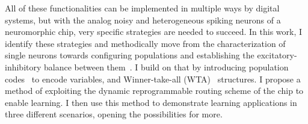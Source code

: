 All of these functionalities can be implemented in multiple ways by digital systems, but with the analog noisy and heterogeneous spiking neurons of a neuromorphic chip, very specific strategies are needed to succeed. In this work, I identify these strategies and methodically move from the characterization of single neurons towards configuring populations and establishing the excitatory-inhibitory balance between them~\cite{Vreeswijk_Sompolinsky96,Shew_etal11,Lim_Goldman13}. I build on that by introducing population codes~\cite{Averbeck_etal06} to encode variables, and Winner-take-all (WTA)~\cite{Indiveri_etal15, Douglas_Martin07} structures.
I propose a method of exploiting the dynamic reprogrammable routing scheme of the chip to enable learning. I then use this method to demonstrate learning applications in three different scenarios, opening the possibilities for more.\\





